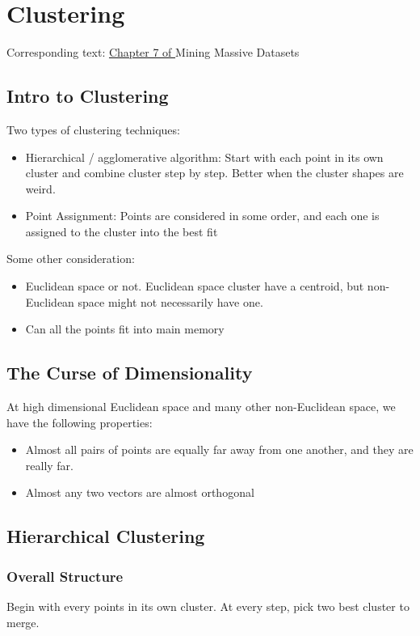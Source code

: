 \chapter{Clustering}
Corresponding text: \href{http://infolab.stanford.edu/~ullman/mmds/ch7.pdf}{Chapter 7 of } Mining Massive Datasets 


\section{Intro to Clustering} 
Two types of clustering techniques: 
    \begin{itemize}
        \item Hierarchical / agglomerative algorithm: Start with each point in its own cluster and combine cluster step by step. Better when the cluster shapes are weird. 
        \item Point Assignment: Points are considered in some order, and each one is assigned to the cluster into the best fit
    \end{itemize}
Some other consideration: 
    \begin{itemize}
        \item Euclidean space or not. Euclidean space cluster have a centroid, but non-Euclidean space might not necessarily have one. 
        \item Can all the points fit into main memory 
    \end{itemize}
    
\section{The Curse of Dimensionality} 
At high dimensional Euclidean space and many other non-Euclidean space, we have the following properties: 
    \begin{itemize}
        \item Almost all pairs of points are equally far away from one another, and they are really far.
        \item Almost any two vectors are almost orthogonal 
    \end{itemize}
    
    
\section{Hierarchical Clustering} 
\subsection{Overall Structure}
Begin with every points in its own cluster. At every step, pick two best cluster to merge. 

